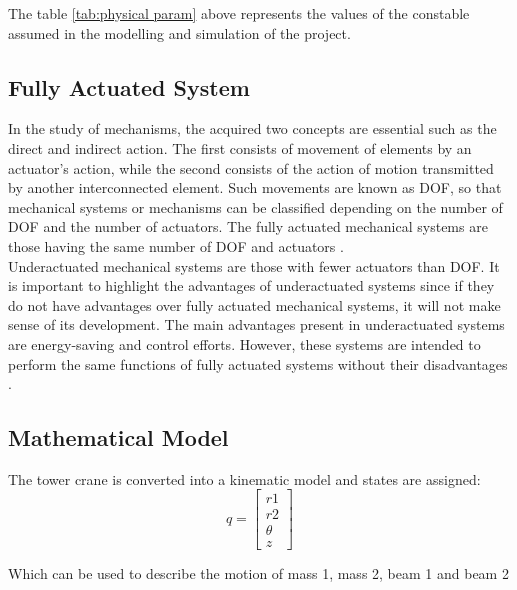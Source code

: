 \documentclass{UoNMCHA}
\numberwithin{equation}{section}
\begin{document}
	The table \ref{tab:physical param} above represents the values of the constable assumed in the modelling and simulation of the project.
	
	
	\subsection{Fully Actuated System}
	
	In the study of mechanisms, the acquired two concepts are essential such as the direct and indirect action. The first consists of movement of elements by an actuator's action, while the second consists of the action of motion transmitted by another interconnected element. Such movements are known as DOF, so that mechanical systems or mechanisms can be classified depending on the number of DOF and the number of actuators. The fully actuated mechanical systems are those having the same number of DOF and actuators \cite{duartemadrid_2017_dynamic}. \\
	
	Underactuated mechanical systems are those with fewer actuators than DOF. It is important to highlight the advantages of underactuated systems since if they do not have advantages over fully actuated mechanical systems, it will not make sense of its development. The main advantages present in underactuated systems are energy-saving and control efforts. However, these systems are intended to perform the same functions of fully actuated systems without their disadvantages \cite{duartemadrid_2017_dynamic}.
	
	\newpage
	\subsection{Mathematical Model}
	
	The tower crane is converted into a kinematic model and states are assigned: 
	\begin{equation}
	q = 
	\begin{bmatrix}
	r1 \\ r2 \\ \theta \\ z
	\end{bmatrix}
	\end{equation}
	
	Which can be used to describe the motion of mass 1, mass 2, beam 1 and beam 2
	
\end{document}
